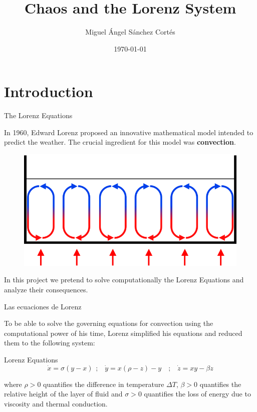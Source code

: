 \documentclass[hyperref={pdfpagelabels=false}]{beamer}
\title{Chaos and the Lorenz System}
\author[Facultad de Ciencias, UNAM]{Miguel Ángel Sánchez Cortés}
\institute{Facultad de Ciencias, UNAM}
\date{\today}
\begin{document}
\maketitleandtoc

\section{Introduction}
\begin{frame}{The Lorenz Equations}\justifying

In 1960, Edward Lorenz proposed an innovative mathematical model intended to predict the weather. The crucial ingredient for this model was \textbf{convection}. 

\vspace{10pt}

\begin{figure}
        \includegraphics[width=0.6\linewidth]{conveccion.png}\\ \vspace{0.5cm}
    \end{figure}

\vspace{-15pt}
In this project we pretend to solve computationally the Lorenz Equations and analyze their consequences. 

\end{frame}
\begin{frame}{Las ecuaciones de Lorenz}

To be able to solve the governing equations for convection using the computational power of his time, Lorenz simplified his equations and reduced them to the following system:

\vspace{10pt}
\begin{block}{Lorenz Equations}
\begin{equation*}
\dot{x}=\sigma(y-x) \hspace{5pt} \text{;} \quad \dot{y}=x(\rho-z)-y \quad \text{;} \quad \dot{z}=xy-\beta z
\end{equation*}
\end{block}

\vspace{10pt}

where $\rho>0$ quantifies the difference in temperature $\Delta T$, $\beta>0$ quantifies the relative height of the layer of fluid and $\sigma>0$ quantifies the loss of energy due to viscosity and thermal conduction.

\end{frame}
\end{document}
